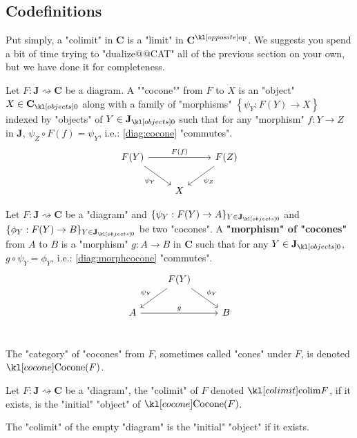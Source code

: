 \documentclass[main.tex]{subfiles}
\begin{document}
\subsection{Codefinitions}
Put simply, a "colimit" in $\mathbf{C}$ is a "limit" in $\op{\mathbf{C}}$. We suggests you spend a bit of time trying to "dualize@@CAT" all of the previous section on your own, but we have done it for completeness.  
\begin{defn}[Cocone]
    Let $F: \mathbf{J}\rightsquigarrow \mathbf{C}$ be a diagram. \AP A ""cocone"" from $F$ to $X$ is an "object" $X \in \obj{\mathbf{C}}$ along with a family of "morphisms" $\left\{ \psi_Y: F(Y) \rightarrow X \right\}$ indexed by "objects" of $Y \in \obj{\mathbf{J}}$ such that for any "morphism" $f:Y \rightarrow Z$ in $\mathbf{J}$, $\psi_Z \circ F(f) = \psi_Y$, i.e.: \eqref{diag:cocone} "commutes".
    \begin{equation}\label{diag:cocone}
        \begin{tikzcd}
            F(Y) \arrow[rd, "\psi_Y"'] \arrow[rr, "F(f)"] & & F(Z) \arrow[ld, "\psi_Z"]\\
            & X & 
        \end{tikzcd}
    \end{equation}
\end{defn}
\begin{defn}
    Let $F:\mathbf{J}\rightsquigarrow \mathbf{C}$ be a "diagram" and $\{\psi_Y: F(Y)\rightarrow A \}_{Y \in \obj{\mathbf{J}}}$ and $\{\phi_Y: F(Y)\rightarrow B\}_{Y \in \obj{\mathbf{J}}}$ be two "cocones". A \textbf{"morphism" of "cocones"} from $A$ to $B$ is a "morphism" $g:A\rightarrow B$ in $\mathbf{C}$ such that for any $Y\in \obj{\mathbf{J}}$, $g \circ \psi_Y = \phi_Y$, i.e.: \eqref{diag:morphcocone} "commutes".
    \begin{equation}\label{diag:morphcocone}
        \begin{tikzcd}
            & F(Y) \arrow[ld, "\psi_Y"'] \arrow[rd, "\phi_Y"] & \\
            A \arrow[rr, "g"] &  & B  \\
        \end{tikzcd}
    \end{equation}
\end{defn}
The "category" of "cocones" from $F$, sometimes called "cones" under $F$, is denoted $\cocone(F)$.
\begin{defn}[Colimit]
    \AP Let $F:\mathbf{J} \rightsquigarrow \mathbf{C}$ be a "diagram", the "colimit" of $F$ denoted $\colim F$, if it exists, is the "initial" "object" of $\cocone(F)$.
\end{defn}
\begin{exmp}
    The "colimit" of the empty "diagram" is the "initial" "object" if it exists.
\end{exmp}
\end{document}
